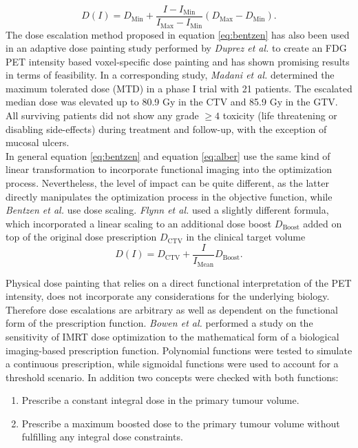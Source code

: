 \begin{itemize}
\begin{equation}\label{eq:bentzen}
D(I) = D_{\mathrm{Min}} + \frac{I-I_{\mathrm{Min}}}{I_{\mathrm{Max}}-I_{\mathrm{Min}}}\left(D_{\mathrm{Max}}-D_{\mathrm{Min}}\right).
\end{equation}
The dose escalation method proposed in equation \ref{eq:bentzen} has also been used in an adaptive dose painting study performed by \textit{Duprez et al.} \cite{pmid20643512} to create an FDG PET intensity based voxel-specific dose painting and has shown promising results in terms of feasibility. In a corresponding study, \textit{Madani et al.} \cite{pmid21742392} determined the maximum tolerated dose (MTD) in a phase I trial with 21 patients. The escalated median dose was elevated up to 80.9 Gy in the CTV and 85.9 Gy in the GTV. All surviving patients did not show any grade $\geq 4$ toxicity (life threatening or disabling side-effects) during treatment and follow-up, with the exception of mucosal ulcers. \\In general equation \ref{eq:bentzen} and equation \ref{eq:alber} use the same kind of linear transformation to incorporate functional imaging into the optimization process. Nevertheless, the level of impact can be quite different, as the latter directly manipulates the optimization process in the objective function, while \textit{Bentzen et al.} use dose scaling. \textit{Flynn et al.} \cite{pmid18635895} used a slightly different formula, which incorporated a linear scaling to an additional dose boost $D_{\mathrm{Boost}}$ added on top of the original dose prescription $D_\mathrm{CTV}$ in the clinical target volume
\begin{equation}
D(I) = D_\mathrm{CTV} + \frac{I}{I_\mathrm{Mean}}D_\mathrm{Boost}.
\end{equation}
\end{itemize}
Physical dose painting that relies on a direct functional interpretation of the PET intensity, does not incorporate any considerations for the underlying biology. Therefore dose escalations are arbitrary as well as dependent on the functional form of the prescription function. \textit{Bowen et al.} \cite{pmid19218733} performed a study on the sensitivity of IMRT dose optimization to the mathematical form of a biological imaging-based prescription function. Polynomial functions were tested to simulate a continuous prescription, while sigmoidal functions were used to account for a threshold scenario. In addition two concepts were checked with both functions:
\begin{enumerate}
\item Prescribe a constant integral dose in the primary tumour volume.
\item Prescribe a maximum boosted dose to the primary tumour volume without fulfilling any integral dose constraints.
\end{enumerate}
